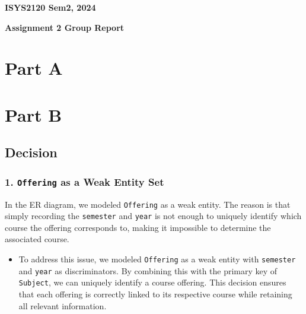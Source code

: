 \documentclass[12pt]{article}
\begin{document}
\begin{flushright}
    \Large{\textbf{ISYS2120 Sem2, 2024}}
\end{flushright}

\begin{center}
    \LARGE{\textbf{Assignment 2 Group Report}} \\
    \vspace{2cm}
    
    \setlength\fboxsep{10pt}
    \setlength\fboxrule{1pt}
    
    \vspace{2cm}
    
    
    \vspace{2cm}

\end{center}

\newpage

\section*{Part A}


\section*{Part B}


\subsection*{Decision}

\subsubsection*{1. \texttt{Offering} as a Weak Entity Set}
In the ER diagram, we modeled \texttt{Offering} as a weak entity. The reason is that simply recording the \texttt{semester} and \texttt{year} is not enough to uniquely identify which course the offering corresponds to, making it impossible to determine the associated course.
\begin{itemize}
    \item To address this issue, we modeled \texttt{Offering} as a weak entity with \texttt{semester} and \texttt{year} as discriminators. By combining this with the primary key of \texttt{Subject}, we can uniquely identify a course offering. This decision ensures that each offering is correctly linked to its respective course while retaining all relevant information.
\end{itemize}
\end{document}
